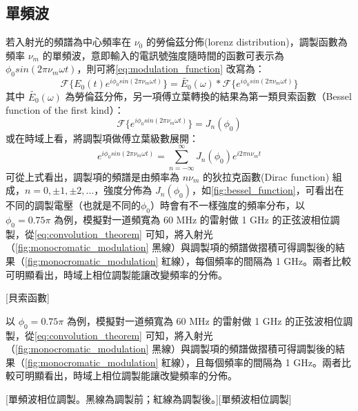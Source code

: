 \documentclass[class=NCU_thesis, crop=false]{standalone}
\begin{document}
\subsection{單頻波}
若入射光的頻譜為中心頻率在 $\nu_{0}$ 的勞倫茲分佈(lorenz distribution)，調製函數為頻率 $\nu_{m}$ 的單頻波，意即輸入的電訊號強度隨時間的函數可表示為 $\phi_{0} sin(2\pi \nu_{m} \omega t)$，則可將\cref{eq:modulation_function} 改寫為：
\begin{equation}
\label{eq:convolution_theorem}
    \mathscr{F}\{E_{0}(t)e^{i\phi_{0} sin(2\pi \nu_{m} \omega t)}\}=\tilde{E_{0}}(\omega)*\mathscr{F}\{{e^{i\phi_{0} sin(2\pi \nu_{m} \omega t)}}\}
\end{equation}
其中 $\tilde{E_{0}}(\omega)$ 為勞倫茲分佈，另一項傅立葉轉換的結果為第一類貝索函數（Bessel function of the first kind）：
\begin{equation}
    \mathscr{F}\{{e^{i\phi_{0} sin(2\pi \nu_{m} \omega t)}}\}=J_{n}(\phi_{0})
\end{equation}
或在時域上看，將調製項做傅立葉級數展開：
\begin{equation}
    e^{i\phi_{0} sin(2\pi \nu_{m} \omega t)}=\sum_{n=-\infty}^{\infty}J_{n}(\phi_{0})e^{i 2 \pi n \nu_{m} t}
\end{equation}
可從上式看出，調製項的頻譜是由頻率為 $n \nu_{m}$ 的狄拉克函數(Dirac function) 組成，$n=0, \pm1, \pm2, ...$，強度分佈為 $J_{n}(\phi_{0})$，如\cref{fig:bessel_function}，可看出在不同的調製電壓（也就是不同的$\phi_{0}$）時會有不一樣強度的頻率分布，以 $\phi_{0}=0.75\pi$ 為例，模擬對一道頻寬為 60 MHz 的雷射做 1 GHz 的正弦波相位調製，從\cref{eq:convolution_theorem} 可知，將入射光（\cref{fig:monocromatic_modulation} 黑線）與調製項的頻譜做摺積可得調製後的結果（\cref{fig:monocromatic_modulation} 紅線），每個頻率的間隔為 1 GHz。兩者比較可明顯看出，時域上相位調製能讓改變頻率的分佈。

[貝索函數]

以 $\phi_{0}=0.75\pi$ 為例，模擬對一道頻寬為 60 MHz 的雷射做 1 GHz 的正弦波相位調製，從\cref{eq:convolution_theorem} 可知，將入射光（\cref{fig:monocromatic_modulation} 黑線）與調製項的頻譜做摺積可得調製後的結果（\cref{fig:monocromatic_modulation} 紅線），且每個頻率的間隔為 1 GHz。兩者比較可明顯看出，時域上相位調製能讓改變頻率的分佈。

[單頻波相位調製。黑線為調製前；紅線為調製後。][單頻波相位調製]
\end{document}
